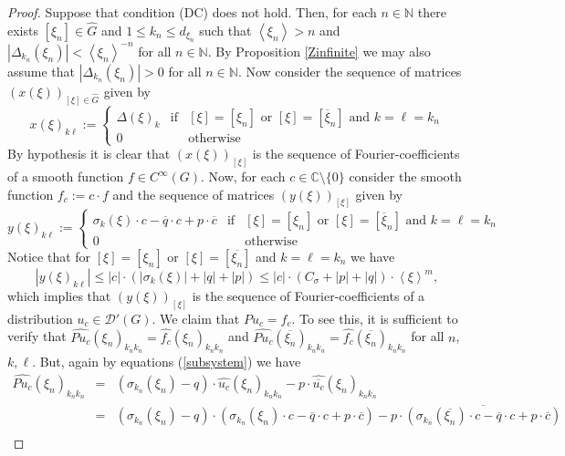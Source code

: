 \documentclass[10pt,a4paper]{amsart}
\def\jp#1{{\left\langle{#1}\right\rangle}}
\begin{document}
\begin{proof} Suppose that condition (DC) does not hold. Then, for each $n \in \mathbb{N}$ there exists $[\xi_n] \in \widehat{G}$ and $1 \leq k_n \leq d_{\xi_n}$ such that $\jp{\xi_n}>n$ and $|\Delta_{k_n}(\xi_n)|<\jp{\xi_n}^{-n}$ for all $n \in \mathbb{N}$. By Proposition \ref{Zinfinite} we may also assume that $|\Delta_{k_n}(\xi_n)|>0$ for all $n \in \mathbb{N}$. Now consider the sequence of matrices $(x(\xi))_{[\xi] \in \widehat{G}}$ given by
	$$x(\xi)_{k\ell}:= \left\{ \begin{array}{ccc} \Delta(\xi)_{k} & \textrm{if} & [\xi]=[\xi_n] \textrm{ or } [\xi]=[\overline{\xi}_n] \textrm{ and } k=\ell=k_n\\ 0 & & \textrm{otherwise}   \end{array}  \right.$$
By hypothesis it is clear that $(x(\xi))_{[\xi]}$ is the sequence of Fourier-coefficients of a smooth function $f \in C^\infty(G)$. Now, for each $c \in \mathbb{C}\setminus \{0\}$ consider the smooth function $f_c:=c \cdot f$ and the sequence of matrices $(y(\xi))_{[\xi]}$ given by
$$y(\xi)_{k\ell}:= \left\{ \begin{array}{ccc} \sigma_{k}(\xi)\cdot c-\overline{q}\cdot c+p\cdot \overline{c} & \textrm{if} & [\xi]=[\xi_n] \textrm{ or } [\xi]=[\overline{\xi}_n] \textrm{ and } k=\ell=k_n\\ 0 & & \textrm{otherwise}   \end{array}  \right.$$
Notice that for $[\xi]=[\xi_n]$ or $[\xi]=[\overline{\xi_n}]$ and $k=\ell=k_n$ we have
$$|y(\xi)_{k \ell}| \leq |c| \cdot(|\sigma_k(\xi)|+|q|+|p|) \leq |c| \cdot (C_\sigma +|p|+|q|)\cdot \jp{\xi}^m,$$
which implies that $(y(\xi))_{[\xi]}$ is the sequence of Fourier-coefficients of a distribution $u_c \in \mathcal{D}'(G)$. We claim that $Pu_c=f_c$. To see this, it is sufficient to verify that $\widehat{Pu_c}(\xi_n)_{k_n k_n}=\widehat{f_c}(\xi_n)_{k_n k_n}$ and $\widehat{Pu_c}(\overline{\xi_n})_{k_n k_n}=\widehat{f_c}(\overline{\xi_n})_{k_n k_n}$  for all $n$, $k,\ell$. But, again by equations (\ref{subsystem}) we have
\begin{eqnarray*}
	\widehat{Pu_c}(\xi_n)_{k_n k_n} & = & (\sigma_{k_n}(\xi_n)-q) \cdot \widehat{u_c}(\xi_n)_{k_n k_n}-p\cdot \widehat{\overline{u_c}}(\xi_n)_{k_n k_n} \\
	& = & (\sigma_{k_n}(\xi_n)-q) \cdot (\sigma_{k_n}(\xi_n)\cdot c-\overline{q}\cdot c +p\cdot \overline{c})- p \cdot \overline{(\sigma_{k_n}(\overline{\xi_n})\cdot c-\overline{q}\cdot c+p\cdot \overline{c})} \\

\end{eqnarray*}
\end{proof}
\end{document}
